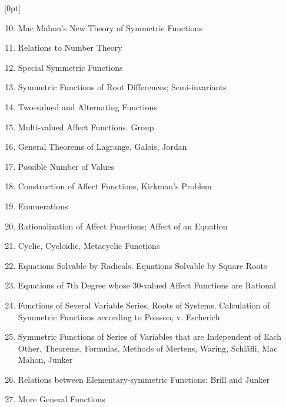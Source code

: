 \thispagestyle{fancy}

\vspace{0.5cm}


[0pt]
  {}
  {\numberline{}\makebox[1.5cm][l]{\thesubsection}}
  {}
  {\contentspage}

\fontsize{6}{0}\selectfont 
\bfseries 

\begin{enumerate}[itemsep=0pt]
    \setcounter{enumi}{9}
    \item Mac Mahon's New Theory of Symmetric Functions
    \item Relations to Number Theory
    \item Special Symmetric Functions
    \item Symmetric Functions of Root Differences; Semi-invariants
    \item Two-valued and Alternating Functions
    \item Multi-valued Affect Functions. Group
    \item General Theorems of Lagrange, Galois, Jordan
    \item Possible Number of Values
    \item Construction of Affect Functions, Kirkman's Problem
    \item Enumerations
    \item Rationalization of Affect Functions; Affect of an Equation
    \item Cyclic, Cycloidic, Metacyclic Functions
    \item Equations Solvable by Radicals. Equations Solvable by Square Roots
    \item Equations of 7th Degree whose 30-valued Affect Functions are Rational
    \item Functions of Several Variable Series, Roots of Systems. Calculation of Symmetric Functions according to Poisson, v. Escherich
    \item Symmetric Functions of Series of Variables that are Independent of Each Other. Theorems, Formulas, Methods of Mertens, Waring, Schläfli, Mac Mahon, Junker
    \item Relations between Elementary-symmetric Functions: Brill and Junker
    \item More General Functions
\end{enumerate}

